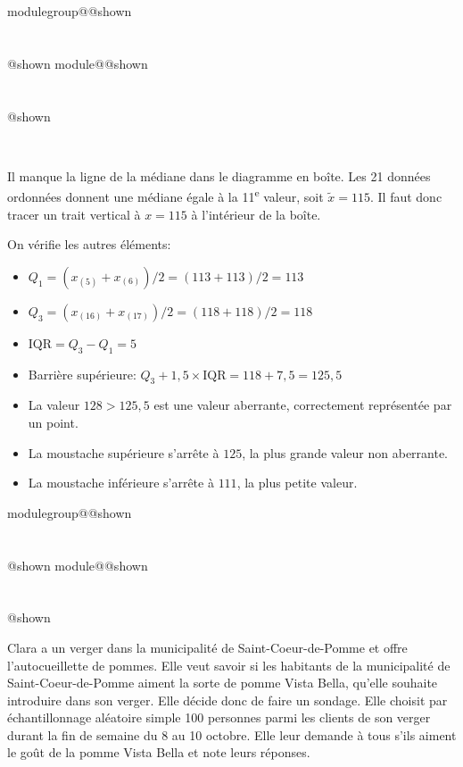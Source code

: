 \documentclass{Evaluation}
\makeatletter
\newcommand{\currentmodulekey}{}
\newcommand{\currentmoduletitle}{}
\newcommand{\currentgroupkey}{}
\newcommand{\currentgrouptitle}{}
\newcommand{\showmoduleifneeded}{%
  \ifx\currentgroupkey\empty\else
    \expandafter\ifx\csname modulegroup@\currentgroupkey @shown\endcsname\relax
      \section*{\currentgrouptitle}%
      \expandafter\gdef\csname modulegroup@\currentgroupkey @shown\endcsname{1}%
    \fi
  \fi
  \expandafter\ifx\csname module@\currentmodulekey @shown\endcsname\relax
    \section*{\currentmoduletitle}%
    \expandafter\gdef\csname module@\currentmodulekey @shown\endcsname{1}%
  \fi
}
\newenvironment{A22}{\showmoduleifneeded}{}
\newenvironment{H26}{\showmoduleifneeded}{}
\makeatother
\begin{document}
\begin{questions}
\begin{H26}
\begin{center}
\\
	\end{center}

\begin{solution}
    Il manque la ligne de la médiane dans le diagramme en boîte. Les 21 données ordonnées donnent une médiane égale à la 11\textsuperscript{e} valeur, soit $\tilde{x}=115$. Il faut donc tracer un trait vertical à $x=115$ à l'intérieur de la boîte.

    On vérifie les autres éléments:
    \begin{itemize}
        \item $Q_1 = (x_{(5)}+x_{(6)})/2=(113+113)/2=113$ \checkmark
        \item $Q_3 = (x_{(16)}+x_{(17)})/2=(118+118)/2=118$ \checkmark
        \item $\text{IQR}=Q_3 - Q_1 = 5$
        \item Barrière supérieure: $Q_3+1{,}5\times\text{IQR}=118+7{,}5=125{,}5$
        \item La valeur $128 > 125{,}5$ est une valeur aberrante, correctement représentée par un point. \checkmark
        \item La moustache supérieure s'arrête à $125$, la plus grande valeur non aberrante. \checkmark
        \item La moustache inférieure s'arrête à $111$, la plus petite valeur. \checkmark
    \end{itemize}
\end{solution}
\end{H26}

\begin{A22}
\question {} %
Clara a un verger dans la municipalité de Saint-Coeur-de-Pomme et offre l'autocueillette de pommes. Elle veut savoir si les habitants de la municipalité de Saint-Coeur-de-Pomme aiment la sorte de pomme Vista Bella, qu'elle souhaite introduire dans son verger. Elle décide donc de faire un sondage. Elle choisit par échantillonnage aléatoire simple 100 personnes parmi les clients de son verger durant la fin de semaine du 8 au 10 octobre. Elle leur demande à tous s'ils aiment le goût de la pomme Vista Bella et note leurs réponses. \\


\end{A22}
\end{questions}
\end{document}
